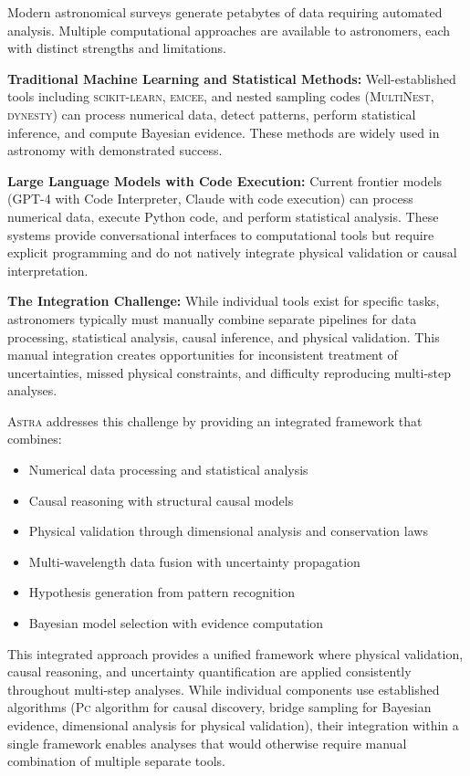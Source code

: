 \documentclass[fleqn,usenatbib]{mnras}
\newcommand{\astra}{\textsc{Astra}\xspace}
\newcommand{\pc}{\textsc{Pc}\xspace}
\begin{document}
Modern astronomical surveys generate petabytes of data requiring automated analysis.
Multiple computational approaches are available to astronomers, each with distinct strengths and limitations.

\textbf{Traditional Machine Learning and Statistical Methods:}
Well-established tools including \textsc{scikit-learn}, \textsc{emcee}, and nested sampling codes (\textsc{MultiNest}, \textsc{dynesty}) can process numerical data, detect patterns, perform statistical inference, and compute Bayesian evidence.
These methods are widely used in astronomy with demonstrated success.

\textbf{Large Language Models with Code Execution:}
Current frontier models (GPT-4 with Code Interpreter, Claude with code execution) can process numerical data, execute Python code, and perform statistical analysis.
These systems provide conversational interfaces to computational tools but require explicit programming and do not natively integrate physical validation or causal interpretation.

\textbf{The Integration Challenge:}
While individual tools exist for specific tasks, astronomers typically must manually combine separate pipelines for data processing, statistical analysis, causal inference, and physical validation.
This manual integration creates opportunities for inconsistent treatment of uncertainties, missed physical constraints, and difficulty reproducing multi-step analyses.

\astra addresses this challenge by providing an integrated framework that combines:
\begin{itemize}
  \item Numerical data processing and statistical analysis
  \item Causal reasoning with structural causal models
  \item Physical validation through dimensional analysis and conservation laws
  \item Multi-wavelength data fusion with uncertainty propagation
  \item Hypothesis generation from pattern recognition
  \item Bayesian model selection with evidence computation
\end{itemize}

This integrated approach provides a unified framework where physical validation, causal reasoning, and uncertainty quantification are applied consistently throughout multi-step analyses.
While individual components use established algorithms (\pc algorithm for causal discovery, bridge sampling for Bayesian evidence, dimensional analysis for physical validation), their integration within a single framework enables analyses that would otherwise require manual combination of multiple separate tools.
\end{document}
